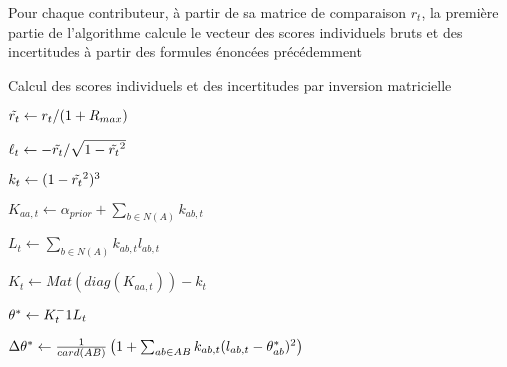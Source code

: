 Pour chaque contributeur, à partir de sa matrice de comparaison $r_t$, la première partie de l'algorithme calcule le vecteur des scores individuels bruts et des incertitudes à partir des formules énoncées précédemment

\pagebreak

\begin{algorithm}
\renewcommand{\algorithmcfname}{Algorithme}
\caption{Calcul des scores individuels et des incertitudes par inversion matricielle}\label{alg:local_scores_matrix_inversion}

$\Tilde{r_t} \leftarrow r_t/(1+R_{max})$

$\ell_t \leftarrow -\Tilde{r_t}/\sqrt{1-\Tilde{r_t}^2}$

$k_t \leftarrow (1-\Tilde{r_t}^2)^3$

$K_{aa,t} \leftarrow \alpha_{prior} + \sum_{b \in N(A)} k_{ab,t}$

$L_t \leftarrow \sum_{b \in N(A)} k_{ab,t}l_{ab,t}$

$K_t \leftarrow Mat(diag(K_{aa,t})) - k_t $ 

$\theta^* \leftarrow K_t^-1 L_t$

$\Delta\theta^* \leftarrow \frac{1}{card(AB)} \left( 1 + \sum_{ab \in AB} k_{ab,t}(l_{ab,t} - \theta^*_{ab})^2 \right)$

\Return{$\score, \deltascore$}
\end{algorithm}

